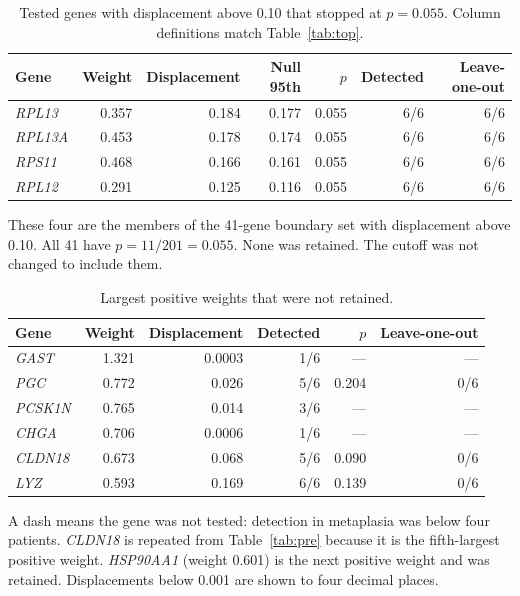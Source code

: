 \documentclass[11pt,a4paper]{article}
\begin{document}
\begin{table}[htbp]
  \centering
  \caption{Tested genes with displacement above 0.10 that stopped at \(p=0.055\). Column definitions match Table~\ref{tab:top}.}
  \label{tab:boundary}
  \footnotesize
  \setlength{\tabcolsep}{3.5pt}
  \begin{tabular}{lrrrrrr}
    \toprule
    Gene & Weight & Displacement & Null 95th & \(p\) & Detected & Leave-one-out \\
    \midrule
    \textit{RPL13} & 0.357 & 0.184 & 0.177 & 0.055 & 6/6 & 6/6 \\
    \textit{RPL13A} & 0.453 & 0.178 & 0.174 & 0.055 & 6/6 & 6/6 \\
    \textit{RPS11} & 0.468 & 0.166 & 0.161 & 0.055 & 6/6 & 6/6 \\
    \textit{RPL12} & 0.291 & 0.125 & 0.116 & 0.055 & 6/6 & 6/6 \\
    \bottomrule
  \end{tabular}
  \par\vspace{0.35em}
  {\raggedright\footnotesize These four are the members of the 41-gene boundary set with displacement above 0.10. All 41 have \(p=11/201=0.055\). None was retained. The cutoff was not changed to include them.\par}
\end{table}

\begin{table}[htbp]
  \centering
  \caption{Largest positive weights that were not retained.}
  \label{tab:weight}
  \footnotesize
  \setlength{\tabcolsep}{3.5pt}
  \begin{tabular}{lrrrrr}
    \toprule
    Gene & Weight & Displacement & Detected & \(p\) & Leave-one-out \\
    \midrule
    \textit{GAST} & 1.321 & 0.0003 & 1/6 & --- & --- \\
    \textit{PGC} & 0.772 & 0.026 & 5/6 & 0.204 & 0/6 \\
    \textit{PCSK1N} & 0.765 & 0.014 & 3/6 & --- & --- \\
    \textit{CHGA} & 0.706 & 0.0006 & 1/6 & --- & --- \\
    \textit{CLDN18} & 0.673 & 0.068 & 5/6 & 0.090 & 0/6 \\
    \textit{LYZ} & 0.593 & 0.169 & 6/6 & 0.139 & 0/6 \\
    \bottomrule
  \end{tabular}
  \par\vspace{0.35em}
  {\raggedright\footnotesize A dash means the gene was not tested: detection in metaplasia was below four patients. \textit{CLDN18} is repeated from Table~\ref{tab:pre} because it is the fifth-largest positive weight. \textit{HSP90AA1} (weight 0.601) is the next positive weight and was retained. Displacements below 0.001 are shown to four decimal places.\par}
\end{table}
\end{document}
